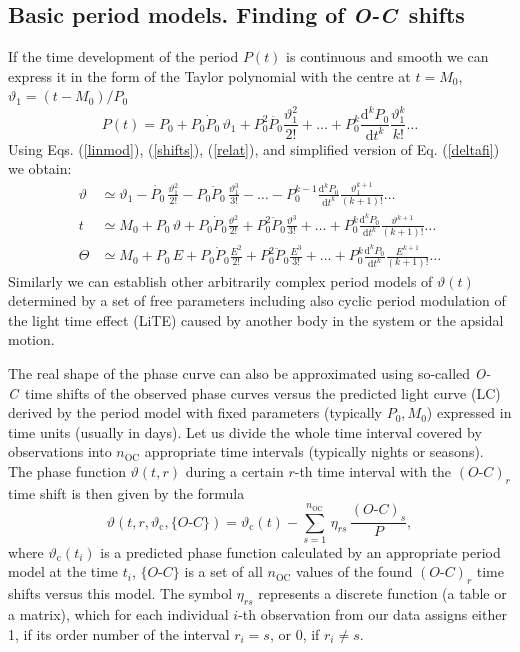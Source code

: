 \documentclass{aa}
\newcommand{\oc}{\textit{O-C}}
\begin{document}
\subsection{Basic period models. Finding of \oc\ shifts}\label{permods}

If the time development of the period $P(t)$ is continuous and smooth we can express it in the form of the Taylor polynomial with the centre at $t=M_0$, $\vartheta_1=(t-M_0)/P_0$
\begin{equation}
\textstyle P(t)=P_0+P_0\dot{P}_0\,\vartheta_1 +P_0^2\ddot{P_0}\frac{\vartheta_1^2}{2!}+\ldots+ P_0^k \frac{\mathrm d^k\!P_0}{\mathrm dt^k}\frac{\vartheta_1^k}{k!}\ldots \label{perlaurin}
\end{equation}
Using Eqs. (\ref{linmod}), (\ref{shifts}), (\ref{relat}), and simplified version of Eq. (\ref{deltafi}) we obtain:
\begin{align}
\vartheta&\textstyle\simeq\vartheta_1 -\dot{P_0}\,\frac{\vartheta_1^2}{2!}-
P_0\ddot{P}_0\,\frac{\vartheta_1^3}{3!}-\ldots - P_0^{k-1} \frac{\mathrm d^k\!P_0}{\mathrm dt^k}\frac{\vartheta_1^{k+1}}{(k+1)!}\ldots \label{thetalaurin}\\
t&\textstyle\simeq M_0\!+\!P_0\,\vartheta+P_0\dot{P}_0\frac{\vartheta^2}{2!}\!+\! P_0^2\ddot{P}_0\frac{\vartheta^3}{3!}\!+\!\ldots\!+\!P_0^k \frac{\mathrm d^k\!P_0}{\mathrm dt^k}\frac{\vartheta^{k+1}}{(k+1)!}\ldots \nonumber     \\
\mathit\Theta&\textstyle\simeq M_0\!+\!P_0\,E+P_0\dot{P}_0\frac{E^2}{2!}\!+\! P_0^2\ddot{P}_0\frac{E^3}{3!}\!+\!\ldots\!+\!P_0^k \frac{\mathrm d^k\!P_0}{\mathrm dt^k}\frac{E^{k+1}}{(k+1)!}\ldots \label{Thetalaurin}
\end{align}
Similarly we can establish other arbitrarily complex period models of $\vartheta(t)$ determined by a set of free parameters including also cyclic period modulation of the  light time effect (LiTE) caused by another body in the system \citep{mikar,liska} or the apsidal motion.

The real shape of the phase curve can also be approximated using so-called \oc\ time shifts of the observed phase curves versus the predicted light curve (LC) derived by the period model with fixed parameters (typically $P_0,M_0$) expressed in time units (usually in days). Let us divide the whole time interval covered by observations into $n_{\mathrm{OC}}$ appropriate time intervals (typically nights or seasons). The phase function $\vartheta(t,r)$ during a certain $r$-th time interval with the $(\oc)_r$ time shift is then given by the formula \citep{miklijiang}
\begin{equation}\label{oc}
\vartheta(t,r,\vartheta_{\mathrm c},\{\oc\})=\vartheta_{\mathrm c}(t) - \sum_{s=1}^{n_{\mathrm{OC}}} \,\eta_{rs}\,\frac{(\oc)_s}{P},
\end{equation}
where $\vartheta_{\mathrm c}(t_i)$ is a predicted phase function calculated by an appropriate period model at the time $t_i$, $\{\oc\}$ is a set of all $n_{\mathrm{OC}}$ values of the found $(\oc)_r$ time shifts versus this model. The symbol $\eta_{rs}$ represents a discrete function (a table or a matrix), which for each individual $i$-th observation from our data assigns either 1, if its order number of the interval $r_i=s$,  or 0, if $r_i\neq s$.
\end{document}

